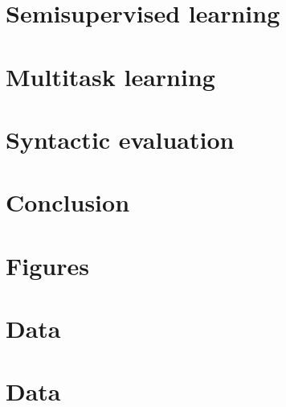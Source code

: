 \documentclass[examplefnt,biber]{../src/nowfnt} %
\begin{document}
\chapter{Semisupervised learning}
\label{05-semisupervised}



\chapter{Multitask learning}
\label{06-multitask}



\chapter{Syntactic evaluation}
\label{07-syneval}



\chapter{Conclusion}
\label{08-conclusion}



\begin{acknowledgements}

\end{acknowledgements}

\appendix
\chapter{Figures}
\label{A1-figures}


\chapter{Data}
\label{A2-data}


\chapter{Data}
\label{A3-data}



\backmatter  %

\printbibliography
\end{document}
